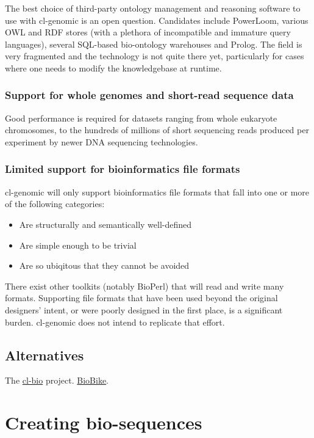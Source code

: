 \documentclass[a4paper, 12pt]{article}
\begin{document}
The best choice of third-party ontology management and reasoning
software to use with cl-genomic is an open question. Candidates
include PowerLoom, various OWL and RDF stores (with a plethora of
incompatible and immature query languages), several SQL-based
bio-ontology warehouses and Prolog. The field is very fragmented and
the technology is not quite there yet, particularly for cases where
one needs to modify the knowledgebase at runtime.


\subsubsection{Support for whole genomes and short-read sequence data}

Good performance is required for datasets ranging from whole eukaryote
chromosomes, to the hundreds of millions of short sequencing reads
produced per experiment by newer DNA sequencing technologies.


\subsubsection{Limited support for bioinformatics file formats}
\label{sec:bioformats}

cl-genomic will only support bioinformatics file formats that fall
into one or more of the following categories:

\begin{itemize}
\item Are structurally and semantically well-defined
\item Are simple enough to be trivial
\item Are so ubiqitous that they cannot be avoided
\end{itemize}

There exist other toolkits (notably BioPerl) that will read and write
many formats. Supporting file formats that have been used beyond the
original designers' intent, or were poorly designed in the first
place, is a significant burden. cl-genomic does not intend to
replicate that effort.

\subsection{Alternatives}
\label{sec:alternate}

The \href{http://common-lisp.net/project/cl-bio}{cl-bio} project.
\href{http://www.biolisp.org}{BioBike}.


\section{Creating bio-sequences}
\label{sec:making-bioseq}
\end{document}
